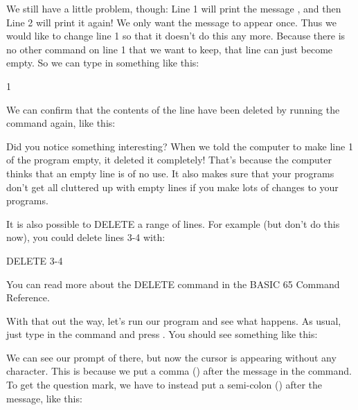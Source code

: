 
\needspace{3cm}
We still have a little problem, though: Line 1 will print the message
, and then Line 2 will print it again!
We only want the message to appear once. Thus we would like to change
line 1 so that it doesn't do this any more.  Because there is no other
command on line 1 that we want to keep, that line can just become
empty. So we can type in something like this:

\begin{screencode}
1
\end{screencode}

\needspace{4cm}
We can confirm that the contents of the line have been deleted by
running the  command again, like this:


Did you notice something interesting? When we told the computer to
make line 1 of the program empty, it deleted it completely!
That's because the computer thinks that an empty line is of no use.
It also makes sure that your programs don't get all cluttered up
with empty lines if you make lots of changes to your programs.

It is also possible to DELETE a range of lines. For example (but don't do this now), you could delete lines 3-4 with:

\begin{screencode}
  DELETE 3-4
\end{screencode}

You can read more about the DELETE command in the BASIC 65 Command Reference.

\needspace{4cm}
With that out the way, let's run our program and see what happens.
As usual, just type in the  command and press
.  You should see something like this:


\needspace{2.5cm}
We can see our prompt of  there, but
now the cursor is appearing without any  character. This is
because we put a comma (\stw{,}) after the message in the 
command.  To get the question mark, we have to instead put a
semi-colon (\stw{;}) after the message, like this:



